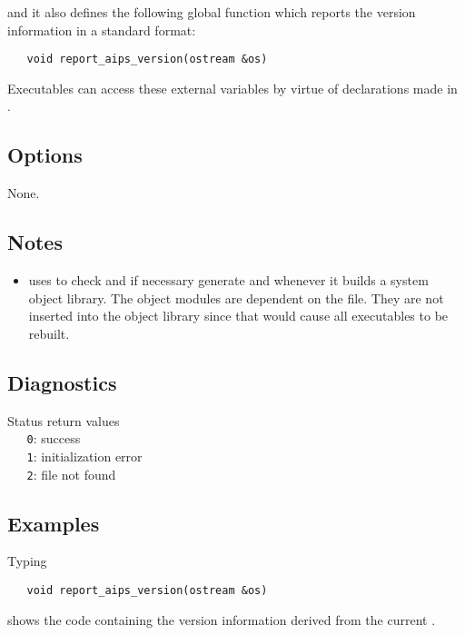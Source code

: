 \noindent
and it also defines the following global function which reports the version
information in a standard format:

\begin{verbatim}
   void report_aips_version(ostream &os)
\end{verbatim}

\noindent
Executables can access these external variables by virtue of declarations
made in .

\subsection*{Options}
 
None.
 
\subsection*{Notes}
 
\begin{itemize}
\item
    uses  to check and if necessary generate
    and  whenever it
   builds a system object library.  The  object modules are
   dependent on the  file.  They are not inserted
   into the object library since that would cause all executables to be
   rebuilt.
\end{itemize}
 
\subsection*{Diagnostics}
 
Status return values
\\ \verb+   0+: success
\\ \verb+   1+: initialization error
\\ \verb+   2+:  file not found
 
\subsection*{Examples}
 
Typing

\begin{verbatim}
   void report_aips_version(ostream &os)
\end{verbatim}

\noindent
shows the code containing the version information derived from the current
.
 
